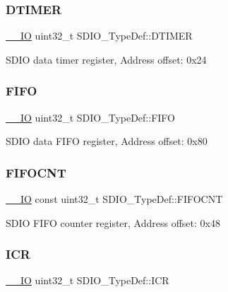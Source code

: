 \subsubsection{\texorpdfstring{D\+T\+I\+M\+ER}{DTIMER}}
{\footnotesize\ttfamily \hyperlink{core__sc300_8h_aec43007d9998a0a0e01faede4133d6be}{\+\_\+\+\_\+\+IO} uint32\+\_\+t S\+D\+I\+O\+\_\+\+Type\+Def\+::\+D\+T\+I\+M\+ER}

S\+D\+IO data timer register, Address offset\+: 0x24 \mbox{\label{struct_s_d_i_o___type_def_ab4757027388ea3a0a6f114d7de2ed4cf}} 
\subsubsection{\texorpdfstring{F\+I\+FO}{FIFO}}
{\footnotesize\ttfamily \hyperlink{core__sc300_8h_aec43007d9998a0a0e01faede4133d6be}{\+\_\+\+\_\+\+IO} uint32\+\_\+t S\+D\+I\+O\+\_\+\+Type\+Def\+::\+F\+I\+FO}

S\+D\+IO data F\+I\+FO register, Address offset\+: 0x80 \mbox{\label{struct_s_d_i_o___type_def_a463869ee8a7e62724f284e42d26aff7f}} 
\subsubsection{\texorpdfstring{F\+I\+F\+O\+C\+NT}{FIFOCNT}}
{\footnotesize\ttfamily \hyperlink{core__sc300_8h_aec43007d9998a0a0e01faede4133d6be}{\+\_\+\+\_\+\+IO} const uint32\+\_\+t S\+D\+I\+O\+\_\+\+Type\+Def\+::\+F\+I\+F\+O\+C\+NT}

S\+D\+IO F\+I\+FO counter register, Address offset\+: 0x48 \mbox{\label{struct_s_d_i_o___type_def_ae3c052b85cc438d2b3069f99620e5139}} 
\subsubsection{\texorpdfstring{I\+CR}{ICR}}
{\footnotesize\ttfamily \hyperlink{core__sc300_8h_aec43007d9998a0a0e01faede4133d6be}{\+\_\+\+\_\+\+IO} uint32\+\_\+t S\+D\+I\+O\+\_\+\+Type\+Def\+::\+I\+CR}

